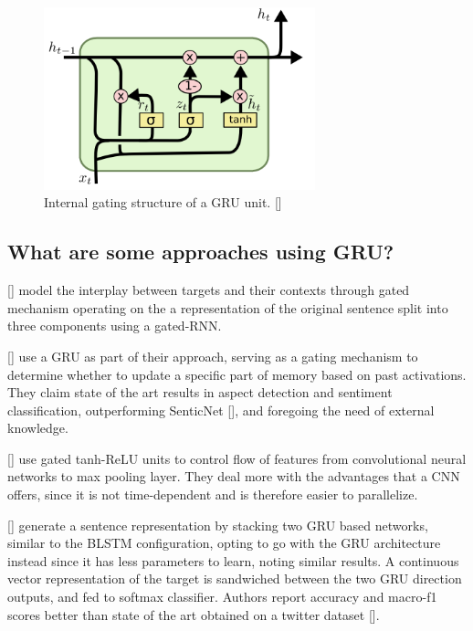 \documentclass[12pt, a4paper]{report}
\theoremstyle{definition}
\theoremstyle{definition}%
\theoremstyle{definition}%
\theoremstyle{definition}%
\theoremstyle{definition}%
\theoremstyle{definition}%
\renewcommand{\cite}[1]{[\citealp{#1}]}
\begin{document}
\begin{figure}[!ht]
	\centering
	\includegraphics[width=0.7\textwidth]{./figures/gru_architecture.png}
	\caption{Internal gating structure of a GRU unit. \cite{colah-understanding-lstm}}
	\label{fig:gru_architecture}
\end{figure}

\subsection{What are some approaches using GRU?}
\cite{zhang2016} model the interplay between targets and their contexts through gated mechanism operating on the a representation of the original sentence split into three components using a gated-RNN.

\cite{liu2018} use a GRU as part of their approach, serving as a gating mechanism to determine whether to update a specific part of memory based on past activations. They claim state of the art results in aspect detection and sentiment classification, outperforming SenticNet \cite{ma2018}, and foregoing the need of external knowledge.

\cite{xue2018} use gated tanh-ReLU units to control flow of features from convolutional neural networks to max pooling layer. They deal more with the advantages that a CNN offers, since it is not time-dependent and is therefore easier to parallelize.

\cite{jabreel2017} generate a sentence representation by stacking two GRU based networks, similar to the BLSTM configuration, opting to go with the GRU architecture instead since it has less parameters to learn, noting similar results. A continuous vector representation of the target is sandwiched between the two GRU direction outputs, and fed to softmax classifier. Authors report accuracy and macro-f1 scores better than state of the art obtained on a twitter dataset \cite{dong}.
\end{document}
